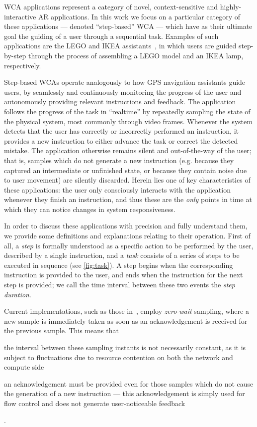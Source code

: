 \acf{WCA} applications represent a category of novel, context-sensitive and highly-interactive \ac{AR} applications.
In this work we focus on a particular category of these applications --- denoted ``step-based'' \ac{WCA} --- which have as their ultimate goal the guiding of a user through a sequential task.
Examples of such applications are the LEGO and IKEA assistants~\cite{Chen2015LEGO,Chen2018application}, in which users are guided step-by-step through the process of assembling a LEGO model and an IKEA lamp, respectively.

Step-based \acp{WCA} operate analogously to how \ac{GPS} navigation assistants guide users, by seamlessly and continuously monitoring the progress of the user and autonomously providing relevant instructions and feedback.
The application follows the progress of the task in ``realtime'' by repeatedly sampling the state of the physical system, most commonly through video frames.
Whenever the system detects that the user has correctly or incorrectly performed an instruction, it provides a new instruction to either advance the task or correct the detected mistake.
The application otherwise remains silent and out-of-the-way of the user; that is, samples which do not generate a new instruction (e.g. because they captured an intermediate or unfinished state, or because they contain noise due to user movement) are silently discarded.
Herein lies one of key characteristics of these applications: the user only consciously interacts with the application whenever they finish an instruction, and thus these are the \emph{only} points in time at which they can notice changes in system responsiveness.

In order to discuss these applications with precision and fully understand them, we provide some definitions and explanations relating to their operation.
First of all, a \emph{step} is formally understood as a specific action to be performed by the user, described by a single instruction, and a \emph{task} consists of a series of steps to be executed in sequence (see \cref{fig:task}).
A step begins when the corresponding instruction is provided to the user, and ends when the instruction for the next step is provided; we call the time interval between these two events the \emph{step duration}.

Current implementations, such as those in~\cite{Chen2015LEGO,Chen2018application}, employ \emph{zero-wait} sampling, where a new sample is immediately taken as soon as an acknowledgement is received for the previous sample.
This means that
\begin{enumerate*}[itemjoin={{; }}, itemjoin*={{; and }}]
    \item the interval between these sampling instants is not necessarily constant, as it is subject to fluctuations due to resource contention on both the network and compute side
    \item an acknowledgement must be provided even for those samples which do not cause the generation of a new instruction --- this acknowledgement is simply used for flow control and does not generate user-noticeable feedback
\end{enumerate*}.

